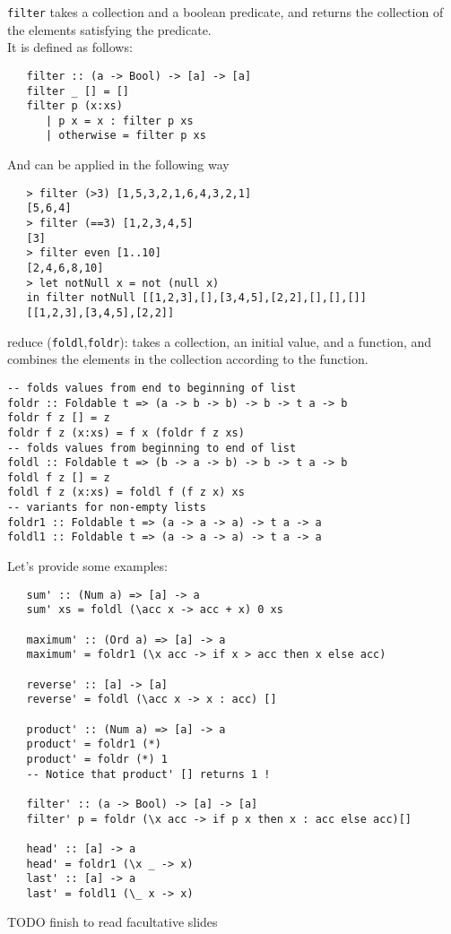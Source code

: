 \lstinline|filter| takes a collection and a boolean predicate, and
returns the collection of the elements satisfying the
predicate.\\
It is defined as follows:
\begin{lstlisting}
   filter :: (a -> Bool) -> [a] -> [a]
   filter _ [] = []
   filter p (x:xs)
      | p x = x : filter p xs
      | otherwise = filter p xs
\end{lstlisting}
And can be applied in the following way
\begin{lstlisting}
   > filter (>3) [1,5,3,2,1,6,4,3,2,1]
   [5,6,4]
   > filter (==3) [1,2,3,4,5]
   [3]
   > filter even [1..10]
   [2,4,6,8,10]
   > let notNull x = not (null x)
   in filter notNull [[1,2,3],[],[3,4,5],[2,2],[],[],[]]
   [[1,2,3],[3,4,5],[2,2]]
\end{lstlisting}

reduce (\lstinline|foldl|,\lstinline|foldr|): takes a collection, an initial value,
and a function, and combines the elements in the
collection according to the function.

\begin{lstlisting}
-- folds values from end to beginning of list
foldr :: Foldable t => (a -> b -> b) -> b -> t a -> b
foldr f z [] = z
foldr f z (x:xs) = f x (foldr f z xs)
-- folds values from beginning to end of list
foldl :: Foldable t => (b -> a -> b) -> b -> t a -> b
foldl f z [] = z
foldl f z (x:xs) = foldl f (f z x) xs
-- variants for non-empty lists
foldr1 :: Foldable t => (a -> a -> a) -> t a -> a
foldl1 :: Foldable t => (a -> a -> a) -> t a -> a
\end{lstlisting}

Let's provide some examples:
\begin{lstlisting}
   sum' :: (Num a) => [a] -> a
   sum' xs = foldl (\acc x -> acc + x) 0 xs
   
   maximum' :: (Ord a) => [a] -> a
   maximum' = foldr1 (\x acc -> if x > acc then x else acc)
   
   reverse' :: [a] -> [a]
   reverse' = foldl (\acc x -> x : acc) []
   
   product' :: (Num a) => [a] -> a
   product' = foldr1 (*)
   product' = foldr (*) 1
   -- Notice that product' [] returns 1 !

   filter' :: (a -> Bool) -> [a] -> [a]
   filter' p = foldr (\x acc -> if p x then x : acc else acc)[]
   
   head' :: [a] -> a
   head' = foldr1 (\x _ -> x)
   last' :: [a] -> a
   last' = foldl1 (\_ x -> x)
\end{lstlisting}

TODO finish to read facultative slides